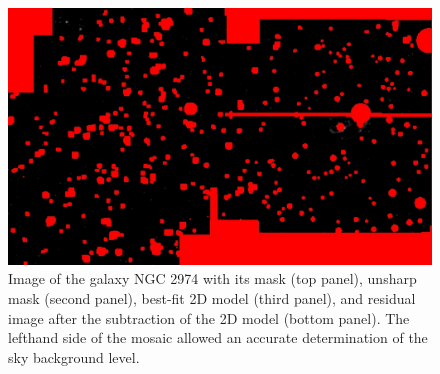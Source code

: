 \documentclass[preprint2]{emulateapj}
\begin{document}
\begin{figure}[h]
\begin{center}
\includegraphics[width=\columnwidth]{images/n2974_resid.jpeg}
\caption{Image of the galaxy NGC 2974 with its mask (top panel), unsharp mask (second panel), 
best-fit 2D model (third panel), 
and residual image after the subtraction of the 2D model (bottom panel).
The lefthand side of the mosaic allowed an accurate determination of the sky background level.}
\label{fig:n29742d}
\end{center}
\end{figure}
\end{document}
